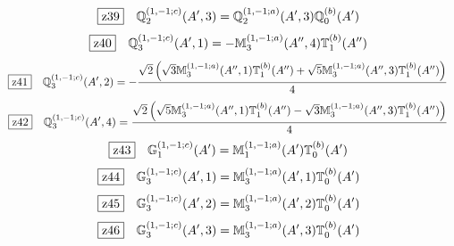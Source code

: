 \documentclass[fleqn,10pt,landscape]{jsarticle}
\begin{document}
\begin{dmath*}
\hspace*{3mm}\fbox{z39}\quad \mathbb{Q}_{2}^{(1,-1;c)}(A^{\prime},3)=\mathbb{Q}_{2}^{(1,-1;a)}(A^{\prime},3) \mathbb{Q}_{0}^{(b)}(A^{\prime})
\end{dmath*}
\begin{dmath*}
\hspace*{3mm}\fbox{z40}\quad \mathbb{Q}_{3}^{(1,-1;c)}(A^{\prime},1)=- \mathbb{M}_{3}^{(1,-1;a)}(A^{\prime\prime},4) \mathbb{T}_{1}^{(b)}(A^{\prime\prime})
\end{dmath*}
\begin{dmath*}
\hspace*{3mm}\fbox{z41}\quad \mathbb{Q}_{3}^{(1,-1;c)}(A^{\prime},2)=- \frac{\sqrt{2} \left(\sqrt{3} \mathbb{M}_{3}^{(1,-1;a)}(A^{\prime\prime},1) \mathbb{T}_{1}^{(b)}(A^{\prime\prime}) + \sqrt{5} \mathbb{M}_{3}^{(1,-1;a)}(A^{\prime\prime},3) \mathbb{T}_{1}^{(b)}(A^{\prime\prime})\right)}{4}
\end{dmath*}
\begin{dmath*}
\hspace*{3mm}\fbox{z42}\quad \mathbb{Q}_{3}^{(1,-1;c)}(A^{\prime},4)=\frac{\sqrt{2} \left(\sqrt{5} \mathbb{M}_{3}^{(1,-1;a)}(A^{\prime\prime},1) \mathbb{T}_{1}^{(b)}(A^{\prime\prime}) - \sqrt{3} \mathbb{M}_{3}^{(1,-1;a)}(A^{\prime\prime},3) \mathbb{T}_{1}^{(b)}(A^{\prime\prime})\right)}{4}
\end{dmath*}
\begin{dmath*}
\hspace*{3mm}\fbox{z43}\quad \mathbb{G}_{1}^{(1,-1;c)}(A^{\prime})=\mathbb{M}_{1}^{(1,-1;a)}(A^{\prime}) \mathbb{T}_{0}^{(b)}(A^{\prime})
\end{dmath*}
\begin{dmath*}
\hspace*{3mm}\fbox{z44}\quad \mathbb{G}_{3}^{(1,-1;c)}(A^{\prime},1)=\mathbb{M}_{3}^{(1,-1;a)}(A^{\prime},1) \mathbb{T}_{0}^{(b)}(A^{\prime})
\end{dmath*}
\begin{dmath*}
\hspace*{3mm}\fbox{z45}\quad \mathbb{G}_{3}^{(1,-1;c)}(A^{\prime},2)=\mathbb{M}_{3}^{(1,-1;a)}(A^{\prime},2) \mathbb{T}_{0}^{(b)}(A^{\prime})
\end{dmath*}
\begin{dmath*}
\hspace*{3mm}\fbox{z46}\quad \mathbb{G}_{3}^{(1,-1;c)}(A^{\prime},3)=\mathbb{M}_{3}^{(1,-1;a)}(A^{\prime},3) \mathbb{T}_{0}^{(b)}(A^{\prime})
\end{dmath*}
\end{document}
